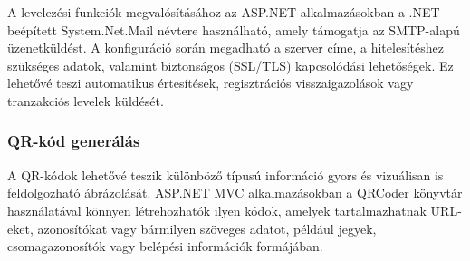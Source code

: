 \indent A levelezési funkciók megvalósításához az ASP.NET alkalmazásokban a .NET beépített System.Net.Mail névtere használható, amely támogatja az SMTP-alapú üzenetküldést. A konfiguráció során megadható a szerver címe, a hitelesítéshez szükséges adatok, valamint biztonságos (SSL/TLS) kapcsolódási lehetőségek. Ez lehetővé teszi automatikus értesítések, regisztrációs visszaigazolások vagy tranzakciós levelek küldését.

\subsubsection{QR-kód generálás}

\indent A QR-kódok lehetővé teszik különböző típusú információ gyors és vizuálisan is feldolgozható ábrázolását. ASP.NET MVC alkalmazásokban a QRCoder könyvtár használatával könnyen létrehozhatók ilyen kódok, amelyek tartalmazhatnak URL-eket, azonosítókat vagy bármilyen szöveges adatot, például jegyek, csomagazonosítók vagy belépési információk formájában.


